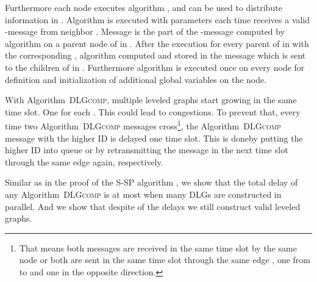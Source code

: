 \documentclass[11pt]{article}
\newif\iffull
\begin{document}
Furthermore each node  executes algorithm \iffull (Line \ref{line:exf})\fi, and can be used to distribute information in . Algorithm  is executed with parameters  each time  receives a valid -message from neighbor . Message  is the part of the -message computed by algorithm  on a parent node  of  in .
After the execution for every parent   of  in  with the corresponding ,  algorithm  computed and stored in  the message which is sent to the children of  in \iffull (Line \ref{line:sendreceivedist})\fi. Furthermore algorithm  is executed once on every node for definition and initialization of additional global variables on the node\iffull (Line \ref{line:DLGinitf})\fi.

With Algorithm\iffull~\ref{alg:DLGcomp}\fi~\textsc{DLGcomp}, multiple leveled graphs  start growing in the same time slot. One  for each . This could lead to congestions. To prevent that, every time two Algorithm\iffull~\ref{alg:DLGcomp}\fi~\textsc{DLGcomp} messages cross\footnote{That means both messages are received in the same time slot by the same node or both are sent in the same time slot through the same edge , one from  to  and one in the opposite direction.}, the Algorithm\iffull~\ref{alg:DLGcomp}\fi~\textsc{DLGcomp} message with the higher ID is delayed one time slot. 
This is done\iffull in Line \ref{line:DLGputLdelay}\fi by putting the higher ID into queue  or by retransmitting the message in the next time slot through the same edge  again, respectively\iffull (due to the if-statement in Line \ref{line:DLGdelay})\fi.

Similar as in the proof of the S-SP algorithm \cite{holzer2012optimal}, we show that the total delay of any Algorithm\iffull~\ref{alg:DLGcomp}\fi~\textsc{DLGcomp} is at most  when  many DLGs are constructed in parallel. And we show that despite of the delays we still construct valid leveled graphs.
\end{document}
